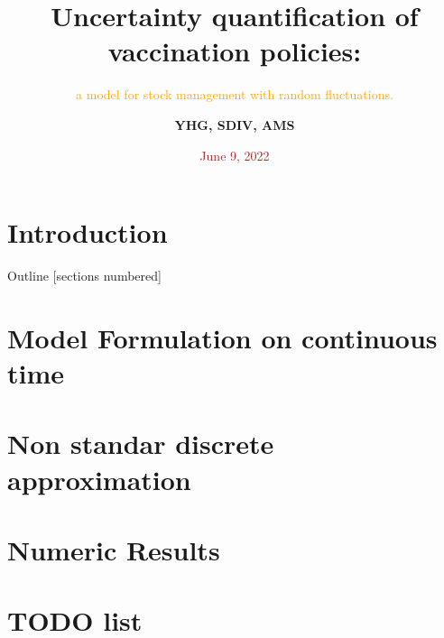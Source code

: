 \documentclass[texcoord,
    10pt]{beamer}
\title{Uncertainty quantification of vaccination policies:
}%
\subtitle{%
        \textcolor{orange}{%
            a model for stock management with random fluctuations.
        }
    }
\date{\textcolor{brown}{June 9,  2022}}
\author{\bf
        YHG, SDIV, AMS
    }
\institute{
        \textcolor{verde}{
            UNACH,
            CONACYT-Universidad de Sonora,
            Universidad de Sonora
        }
    }
\begin{document}
    \maketitle
     \section*{Introduction}
         
     \begin{frame}{Outline}
         \hypersetup{linkcolor=black}
         [sections numbered]
         \tableofcontents
     \end{frame}
     \section{Model Formulation on continuous time}
         
     \section{Non standar discrete approximation}
         
     \section{Numeric Results}
        
     \section{TODO list}
        
\end{document}
